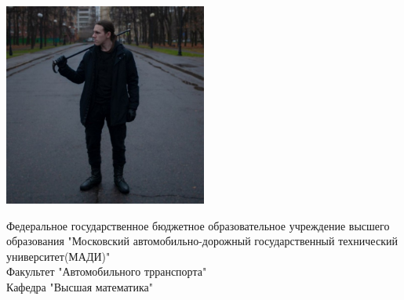 \begin{titlepage}
\begin{center}
\includegraphics[width=0.5\textwidth]{loks.jpg}
\end{center}

\begin{center}
\LARGE
Федеральное государственное бюджетное образовательное 
учреждение высшего образования "Московский автомобильно-дорожный 
государственный технический университет(МАДИ)"\\

Факультет "Автомобильного трранспорта"\\

Кафедра "Высшая математика"

\end{center}
\end{titlepage}